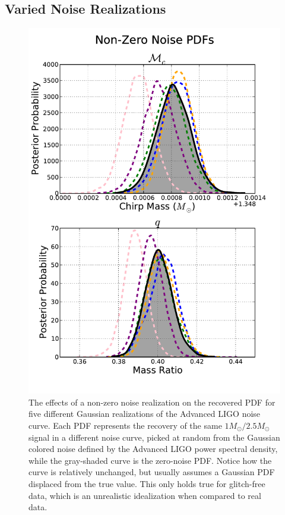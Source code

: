 \documentclass[11pt,a4paper]{emulateapj}
\begin{document}
\subsection{Varied Noise Realizations}
\label{noiseSection}

\begin{figure}[ht!]
  \centering
 \includegraphics[trim=0cm 0cm 0cm 0cm, clip=true,scale=0.52]{noisePDF.pdf}
 \caption{The effects of a non-zero noise realization on the recovered PDF for five different Gaussian realizations of the 
 Advanced LIGO noise curve.  Each PDF represents the recovery of the same $1M_{\odot}/2.5M_{\odot}$ signal in a
  different noise curve, picked at random from the Gaussian colored noise defined by the Advanced LIGO power
   spectral density, while the gray-shaded curve is the zero-noise PDF.  Notice how the curve is relatively unchanged,
    but usually assumes a Gaussian PDF displaced from the true value.  This only holds true for glitch-free data, which
     is an unrealistic idealization when compared to real data.}
 \label{noisePDFs}
\end{figure}
  
\end{document}

